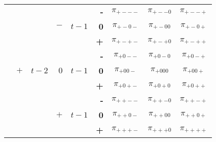 \documentclass{article}[]
\begin{document}
\begin{center}
\begin{tabular}{r | r | r | r | r | r | c c c | }
& &     &	&	&    \textbf{-} & $\pi_{+---}$	& $\pi_{+--0}$	& $\pi_{+--+}$ \\ 
& & &  $-$ &$t-1$ & \textbf{0} & $\pi_{+-0-}$	& $\pi_{+-00}$	& $\pi_{+-0+}$	\\
& &      &   &		&    \textbf{+} & $\pi_{+-+-}$	& $\pi_{+-+0}$	& $\pi_{+-++}$ \\ \cline{4-4} \cline{6-9}
& &      &   &		&    \textbf{-} & $\pi_{+0--}$	& $\pi_{+0-0}$	& $\pi_{+0-+}$ \\ 
& $+$  & $t-2$ & $0$   &$t-1$ & \textbf{0} & $\pi_{+00-}$	& $\pi_{+000}$	& $\pi_{+00+}$	\\
& &      &   &		&    \textbf{+} & $\pi_{+0+-}$	& $\pi_{+0+0}$	& $\pi_{+0++}$ \\ \cline{4-4} \cline{6-9}
& &      &   &		&    \textbf{-} & $\pi_{++--}$	& $\pi_{++-0}$	& $\pi_{++-+}$ \\ 
& & &$+$   &$t-1$ & \textbf{0} & $\pi_{++0-}$	& $\pi_{++00}$	& $\pi_{++0+}$	\\
& &      &   &		&    \textbf{+} & $\pi_{+++-}$	& $\pi_{+++0}$	& $\pi_{++++}$ \\ \cline{2-2} \cline{4-4} \cline{6-9}
\end{tabular}    
\end{center}
\end{document}
